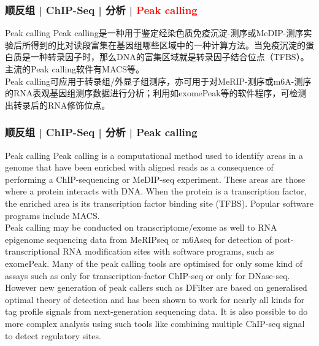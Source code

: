 \begin{frame}
  \frametitle{顺反组 | ChIP-Seq | 分析 | \textcolor{red}{Peak calling}}
  \begin{block}{Peak calling}
    Peak calling是一种用于鉴定经染色质免疫沉淀-测序或MeDIP-测序实验后所得到的比对读段富集在基因组哪些区域中的一种计算方法。当免疫沉淀的蛋白质是一种转录因子时，那么DNA的富集区域就是转录因子结合位点（TFBS）。主流的Peak calling软件有MACS等。\\
    \vspace{1em}
    Peak calling可应用于转录组/外显子组测序，亦可用于对MeRIP-测序或m6A-测序的RNA表观基因组测序数据进行分析；利用如exomePeak等的软件程序，可检测出转录后的RNA修饰位点。
  \end{block}
\end{frame}

\begin{frame}
  \frametitle{顺反组 | ChIP-Seq | 分析 | Peak calling}
  {\footnotesize
  \begin{block}{Peak calling}
    Peak calling is a computational method used to identify areas in a genome that have been enriched with aligned reads as a consequence of performing a ChIP-sequencing or MeDIP-seq experiment. These areas are those where a protein interacts with DNA. When the protein is a transcription factor, the enriched area is its transcription factor binding site (TFBS). Popular software programs include MACS.\\
    \vspace{1em}
    Peak calling may be conducted on transcriptome/exome as well to RNA epigenome sequencing data from MeRIPseq or m6Aseq for detection of post-transcriptional RNA modification sites with software programs, such as exomePeak. Many of the peak calling tools are optimised for only some kind of assays such as only for transcription-factor ChIP-seq or only for DNase-seq. However new generation of peak callers such as DFilter are based on generalised optimal theory of detection and has been shown to work for nearly all kinds for tag profile signals from next-generation sequencing data. It is also possible to do more complex analysis using such tools like combining multiple ChIP-seq signal to detect regulatory sites.
  \end{block}
  }
\end{frame}

